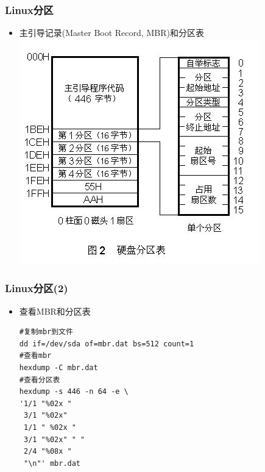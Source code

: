 \documentclass[xcolor=svgnames,presentation]{beamer}
\begin{document}
\begin{frame}
\frametitle{Linux分区}
\label{sec-1-3}
\begin{itemize}

\item 主引导记录(Master Boot Record, MBR)和分区表\\
\label{sec-1-3-1}%
\includegraphics[width=.9\linewidth]{img/mbr.jpg}
\end{itemize} %
\end{frame}
\begin{frame}[fragile]
\frametitle{Linux分区(2)}
\label{sec-1-4}
\begin{itemize}

\item 查看MBR和分区表\\
\label{sec-1-4-1}%
\begin{verbatim}
#复制mbr到文件
dd if=/dev/sda of=mbr.dat bs=512 count=1
#查看mbr
hexdump -C mbr.dat
#查看分区表
hexdump -s 446 -n 64 -e \
'1/1 "%02x " 
 3/1 "%02x" 
 1/1 " %02x " 
 3/1 "%02x" " " 
 2/4 "%08x " 
 "\n"' mbr.dat
\end{verbatim}
\end{itemize} %
\end{frame}
\end{document}
